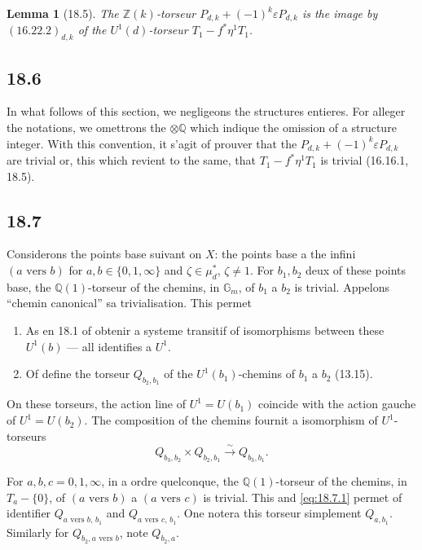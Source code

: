 \documentclass[12pt,a4paper]{article}
\theoremstyle{plain}
\newtheorem{lemma}[theorem]{Lemma}
\theoremstyle{definition}
\theoremstyle{remark}
\newcommand{\Gm}{\mathbb{G}_m}
\newcommand{\ZZ}{\mathbb{Z}}
\newcommand{\QQ}{\mathbb{Q}}
\begin{document}
\begin{lemma}[18.5]\label{lem:18.5}
The $\ZZ(k)$-torseur $P_{d,k} + (-1)^k \varepsilon P_{d,k}$ is the image
by $(16.22.2)_{d,k}$ of the $U^1(d)$-torseur $T_1 - f^*\eta^1 T_1$.
\end{lemma}

\subsection{18.6}

In what follows of this section, we negligeons the structures
entieres. For alleger the notations, we omettrons the $\otimes \QQ$
which indique the omission of a structure integer. With this
convention, it s'agit of prouver that the
$P_{d,k} + (-1)^k \varepsilon P_{d,k}$ are trivial or, this which revient
to the same, that $T_1 - f^*\eta^1 T_1$ is trivial (16.16.1, 18.5).

\subsection{18.7}

Considerons the points base suivant on $X$: the points base a
the infini $(a \text{ vers } b)$ for $a, b \in \{0, 1, \infty\}$ and
$\zeta \in \mu_d^*$, $\zeta \neq 1$. For $b_1, b_2$ deux of these points
base, the $\QQ(1)$-torseur of the chemins, in $\Gm$, of $b_1$ a $b_2$
is trivial. Appelons ``chemin canonical'' sa trivialisation. This
permet
\begin{enumerate}
\item[(a)] As en 18.1 of obtenir a systeme transitif
of isomorphisms between these $U^1(b)$ --- all identifies a $U^1$.
\item[(b)] Of define the torseur $Q_{b_2,b_1}$ of the
$U^1(b_1)$-chemins of $b_1$ a $b_2$ (13.15).
\end{enumerate}

On these torseurs, the action line of $U^1 = U(b_1)$ coincide with
the action gauche of $U^1 = U(b_2)$. The composition of the chemins fournit
a isomorphism of $U^1$-torseurs
\begin{equation}\label{eq:18.7.1}
Q_{b_3,b_2} \times Q_{b_2,b_1} \xrightarrow{\sim} Q_{b_3,b_1}.
\end{equation}

For $a, b, c = 0, 1, \infty$, in a ordre quelconque, the
$\QQ(1)$-torseur of the chemins, in $T_a - \{0\}$, of
$(a \text{ vers } b)$ a $(a \text{ vers } c)$ is trivial. This and
\eqref{eq:18.7.1} permet of identifier
$Q_{a \text{ vers } b,\, b_1}$ and $Q_{a \text{ vers } c,\, b_1}$. One
notera this torseur simplement $Q_{a,b_1}$. Similarly for
$Q_{b_2, a \text{ vers } b}$, note $Q_{b_2,a}$.
\end{document}
